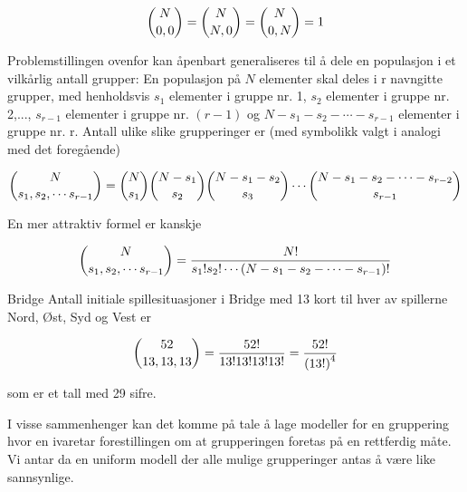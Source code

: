 \[ {{N}\choose{0,0}}={{N}\choose{N,0}}={{N}\choose{0,N}} =1 \]

Problemstillingen ovenfor kan åpenbart generaliseres til å dele
en populasjon i et vilkårlig antall grupper: En populasjon på $N$
elementer skal deles i r navngitte grupper, med henholdsvis $s_1$
elementer i gruppe nr. 1, $s_2$ elementer i gruppe nr. 2,...,
$s_{r-1}$ elementer i gruppe nr. $(r-1)$ og $N-s_1-s_2-\cdots -
s_{r-1}$ elementer i gruppe nr. r. Antall ulike slike
grupperinger er (med symbolikk valgt i analogi med det
foregående)

\[ {{N}\choose{s_1,s_2, \cdots s_{r-1}}}={{N}\choose{s_1}} {{N-s_1}\choose{s_2}}
    {{N-s_1-s_2}\choose{s_3}} \cdots  {{N-s_1-s_2- \cdots -s_{r-2}}\choose{s_{r-1}}}  \]

\noindent En mer attraktiv formel er kanskje

\[ {{N}\choose{s_1,s_2, \cdots s_{r-1}}}=\frac{N!}{s_1!s_2! \cdots
                                              (N-s_1-s_2- \cdots -s_{r-1})!} \]
\begin{eksempel}{Bridge}
Antall initiale spillesituasjoner i Bridge med 13 kort til hver
av spillerne Nord, Øst, Syd og Vest er

\[ {{52}\choose{13,13,13}}= \frac{52!}{13!13!13!13!}=\frac{52!}{{(13!)}^4} \]

\noindent som er et tall med 29 sifre.
\end{eksempel}

I visse sammenhenger kan det komme på tale å lage modeller for en
gruppering hvor en ivaretar forestillingen om at grupperingen
foretas på en rettferdig måte. Vi antar da en uniform modell der
alle mulige grupperinger antas å være like sannsynlige. \\

